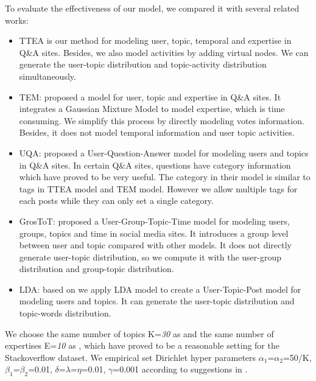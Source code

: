 {{{{{{{To evaluate the effectiveness of our model, we compared it with several related works:  
\begin{itemize}
\item{TTEA} is our method for modeling user, topic, temporal and expertise in Q\&A sites. Besides, we also model activities by adding virtual nodes. We can generate the user-topic distribution and topic-activity distribution simultaneously. 
\item{TEM}: \cite{yang2013cqarank} proposed a model for user, topic and expertise in Q\&A sites. It integrates a Gaussian Mixture Model to model expertise, which is time consuming. We simplify this process by directly modeling votes information. Besides, it does not model temporal information and user topic activities. 
\item{UQA}: \cite{guo2008tapping} proposed a User-Question-Answer model for modeling users and topics in Q\&A  sites. In certain Q\&A  sites, questions have category information which have proved to be very useful. The category in their model is similar to tags in TTEA model and TEM model. However we allow multiple tags for each posts while they can only set a single category.
\item{GrosToT}: \cite{hu2014user} proposed a User-Group-Topic-Time model for modeling users, groups, topics and time in social media sites. It introduces a group level between user and topic compared with other models. It does not directly generate user-topic distribution, so we compute it with the user-group distribution and group-topic distribution.%
\item{LDA}: based on \cite{blei2003latent} we apply LDA model to create a User-Topic-Post model for modeling users and topics. It can generate the user-topic distribution and topic-words distribution.

\end{itemize}


We choose the same number of topics K=\textit{30} as \cite{Chang:2013} and the same number of expertises E=\textit{10} as \cite{yang2013cqarank}, which have proved to be a reasonable setting for the Stackoverflow dataset. We empirical set Dirichlet hyper parameters $\alpha_1$=$\alpha_2$=50/K, $\beta_1$=$\beta_2$=0.01, $\delta$=$\lambda$=$\eta$=0.01, $\gamma$=0.001 according to suggestions in \cite{griffiths2004finding}. 


}}}}}}}
